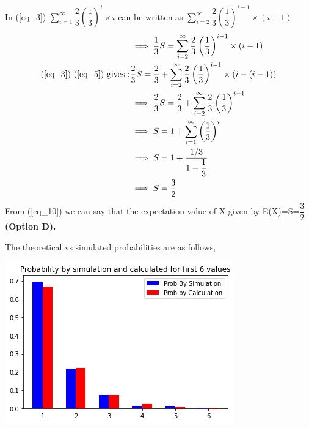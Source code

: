 \documentclass[a4paper]{article}
\begin{document}
\begin{multicols*}{2}
In (\ref{eq_3})	$\sum_{i=1}^{\infty} \dfrac{2}{3}\left(\dfrac{1}{3}\right)^{i} \times i$ can be written as $\sum_{i=2}^{\infty} \dfrac{2}{3}\left(\dfrac{1}{3}\right)^{i-1} \times (i-1)$
\begin{align}
& \implies \dfrac{1}{3}S=\sum_{i=2}^{\infty} \dfrac{2}{3}\left(\dfrac{1}{3}\right)^{i-1} \times (i-1) \label{eq_5} \\
\text{(\ref{eq_3})-(\ref{eq_5}) gives :}& \dfrac{2}{3}S=\dfrac{2}{3}+\sum_{i=2}^{\infty} \dfrac{2}{3}\left(\dfrac{1}{3}\right)^{i-1} \times (i-(i-1))\\
&\implies  \dfrac{2}{3}S=\dfrac{2}{3}+\sum_{i=2}^{\infty} \dfrac{2}{3}\left(\dfrac{1}{3}\right)^{i-1}\\
& \implies S=1+\sum_{i=1}^{\infty}\left(\dfrac{1}{3}\right)^{i}\\
& \implies S=1+\dfrac{1/3}{1-\dfrac{1}{3}}\\
& \implies S=\dfrac{3}{2} \label{eq_10}
\end{align}
From (\ref{eq_10}) we can say that the expectation value of X given by E(X)=S=$\dfrac{3}{2}$		
\textbf{(Option D).}

\vspace{3cm}


The theoretical vs simulated probabilities are as follows,\\

\begin{center}
\includegraphics[scale=0.5]{img-1}
\end{center}




\end{multicols*}
\end{document}
